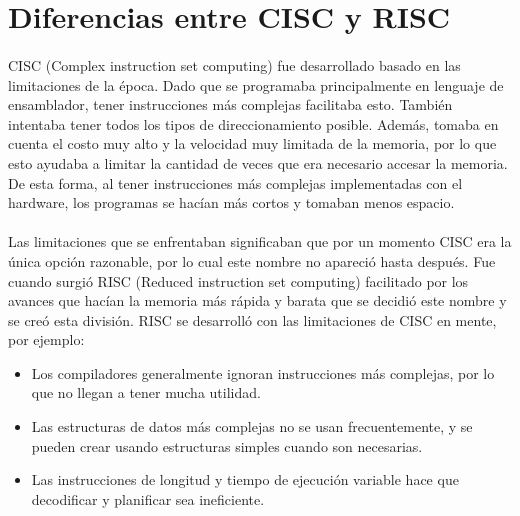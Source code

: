 \documentclass[10pt,a4paper]{article}
\begin{document}
\section*{Diferencias entre CISC y RISC}
\paragraph{}
CISC (Complex instruction set computing) fue desarrollado basado en las limitaciones de la época. Dado que se programaba principalmente en lenguaje de ensamblador, tener instrucciones más complejas facilitaba esto. También intentaba tener todos los tipos de direccionamiento posible. Además, tomaba en cuenta el costo muy alto y la velocidad muy limitada de la memoria, por lo que esto ayudaba a limitar la cantidad de veces que era necesario accesar la memoria. De esta forma, al tener instrucciones más complejas implementadas con el hardware, los programas se hacían más cortos y tomaban menos espacio.

\paragraph{}
Las limitaciones que se enfrentaban significaban que por un momento CISC era la única opción razonable, por lo cual este nombre no apareció hasta después. Fue cuando surgió RISC (Reduced instruction set computing) facilitado por los avances que hacían la memoria más rápida y barata que se decidió este nombre y se creó esta división. RISC se desarrolló con las limitaciones de CISC en mente, por ejemplo:	
\begin{itemize}
\item Los compiladores generalmente ignoran instrucciones más complejas, por 	lo que no llegan a tener mucha utilidad.
\item Las estructuras de datos más complejas no se usan frecuentemente, y se pueden crear usando estructuras simples cuando son necesarias.
\item Las instrucciones de longitud y tiempo de ejecución variable hace que decodificar y planificar sea ineficiente.
\end{itemize}
\end{document}

